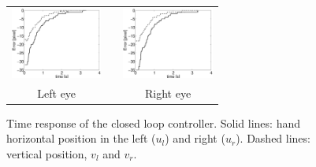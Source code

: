 \begin{figure}
  \begin{center}
	\begin{tabular}{ccc}
	  \parbox{30mm}{\includegraphics[width=30mm]{Figure/TimeReponseLeftClosedLoop.eps}}  & \hspace{.1cm} &
	  \parbox{30mm}{\includegraphics[width=30mm]{Figure/TimeReponseRightClosedLoop.eps}}
	  \\
	  \parbox{30mm}{\centering Left eye } & \hspace{0.1cm} & \parbox{30mm}{\centering Right eye }
  \end{tabular}
\end{center}
\caption{Time response of the closed loop controller. Solid lines: hand horizontal position in the left ($u_l$) and right ($u_r$). Dashed lines: vertical position, $v_l$ and $v_r$.}\label{Fig:TimeResponseClosedLoopErrors}
  \end{figure}


